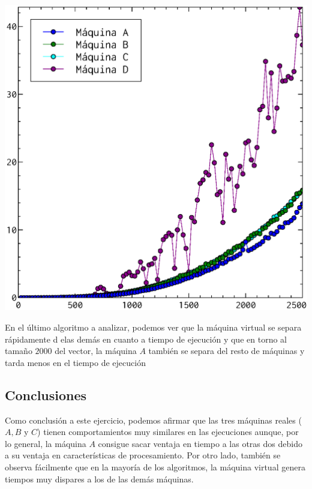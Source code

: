 \documentclass[a4paper, 11pt]{article}
\begin{document}
\begin{enumerate}
\begin{center}
      \includegraphics[scale=0.5]{floyd_todos.eps}\\
    \end{center}
    
  En el último algoritmo a analizar, podemos ver que la máquina virtual se separa rápidamente d elas demás en cuanto a tiempo de ejecución y que en torno al tamaño $2000$ del vector, la máquina $A$ también se separa del resto de máquinas y tarda menos en el tiempo de ejecución
  \subsection{Conclusiones}
  Como conclusión a este ejercicio, podemos afirmar que las tres máquinas reales ($A,B$ y $C$) tienen comportamientos muy similares en las ejecuciones aunque, por lo general, la máquina $A$ consigue sacar ventaja en tiempo a las otras dos debido a su ventaja en características de procesamiento. Por otro lado, también se observa fácilmente que en la mayoría de los algoritmos, la máquina virtual genera tiempos muy dispares a los de las demás máquinas.
\end{enumerate}
\end{document}
